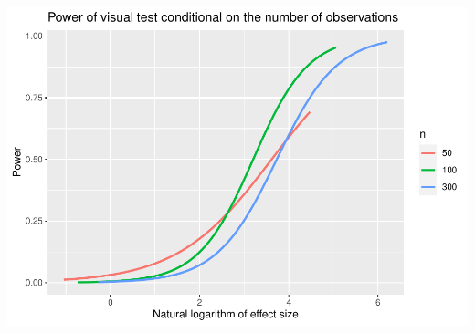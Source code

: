\documentclass[]{interact}
\theoremstyle{plain}%
\theoremstyle{definition}
\theoremstyle{remark}
\begin{document}
\includegraphics{paper_comparison_files/figure-latex/power-of-visual-test-given-number-of-observations-1.pdf}



\end{document}
